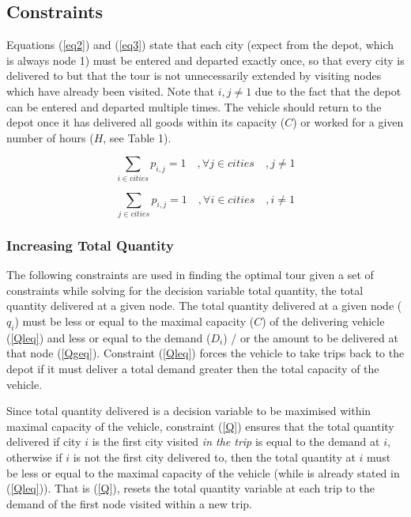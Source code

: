 \documentclass[a4paper,11pt]{article}
\begin{document}
\subsection{Constraints}

Equations (\ref{eq2}) and (\ref{eq3}) state that each city (expect from the depot, which is always node 1) must be entered and departed exactly once, so that every city is delivered to but that the tour is not unnecessarily extended by visiting nodes which have already been visited. Note that $i,j\neq1$ due to the fact that the depot can be entered and departed multiple times. The vehicle should return to the depot once it has delivered all goods within its capacity ($C$) or worked for a given number of hours ($H$, see Table 1). 

\begin{equation}\label{eq2}
\sum\limits_{i \in cities} p_{i,j} = 1 \quad , \forall j \in cities \quad, j\neq1
\end{equation}

\begin{equation}\label{eq3}
\sum\limits_{j \in cities} p_{i,j} = 1 \quad , \forall i \in cities\quad, i\neq1
\end{equation}



\subsubsection{Increasing Total Quantity}

The following constraints are used in finding the optimal tour given a set of constraints while solving for the decision variable total quantity, the total quantity delivered at a given node. The total quantity delivered at a given node ($q_{i}$) must be less or equal to the maximal capacity ($C$) of the delivering vehicle (\ref{Qleq}) and less or equal to the demand ($D_{i}$) / or the amount to be delivered at that node (\ref{Qgeq}). Constraint (\ref{Qleq}) forces the vehicle to take trips back to the depot if it must deliver a total demand greater then the total capacity of the vehicle.

Since total quantity delivered is a decision variable to be maximised within maximal capacity of the vehicle, constraint (\ref{Q}) ensures that the total quantity delivered if city $i$ is the first city visited \textit{in the trip} is equal to the demand at $i$, otherwise if $i$ is not the first city delivered to, then the total quantity at $i$ must be less or equal to the maximal capacity of the vehicle (while is already stated in (\ref{Qleq})). That is (\ref{Q}), resets the total quantity variable at each trip to the demand of the first node visited within a new trip. 
\end{document}
